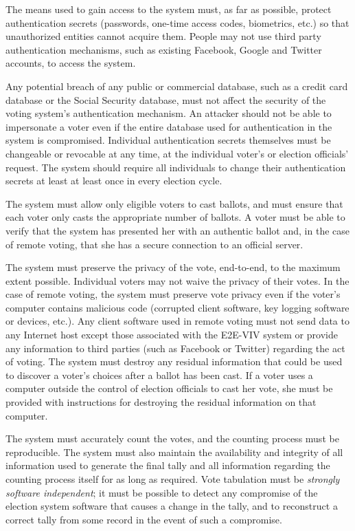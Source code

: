 The means used to gain access to the system must, as far as possible,
protect authentication secrets (passwords, one-time access codes,
biometrics, etc.) so that unauthorized entities cannot acquire
them. People may not use third party authentication mechanisms, such
as existing Facebook, Google and Twitter accounts, to access the
system. 

Any potential breach of any public or commercial database, such as a
credit card database or the Social Security database, must not affect
the security of the voting system's authentication mechanism. An
attacker should not be able to impersonate a voter even if the entire
database used for authentication in the system is
compromised. Individual authentication secrets themselves must be
changeable or revocable at any time, at the individual voter's or
election officials' request. The system should require all individuals
to change their authentication secrets at least at least once in every
election cycle.

The system must allow only eligible voters to cast ballots, and must
ensure that each voter only casts the appropriate number of ballots. A
voter must be able to verify that the system has presented her with an
authentic ballot and, in the case of remote voting, that she has a
secure connection to an official server.

The system must preserve the privacy of the vote, end-to-end, to the
maximum extent possible. Individual voters may not waive the privacy
of their votes. In the case of remote voting, the system must preserve
vote privacy even if the voter's computer contains malicious code
(corrupted client software, key logging software or devices,
etc.). Any client software used in remote voting must not send data to
any Internet host except those associated with the E2E-VIV system or
provide any information to third parties (such as Facebook or Twitter)
regarding the act of voting. The system must destroy any residual
information that could be used to discover a voter's choices after a
ballot has been cast. If a voter uses a computer outside the control
of election officials to cast her vote, she must be provided with
instructions for destroying the residual information on that computer.

The system must accurately count the votes, and the counting process
must be reproducible. The system must also maintain the availability
and integrity of all information used to generate the final tally and
all information regarding the counting process itself for as long as
required. Vote tabulation must be \emph{strongly software
  independent}; it must be possible to detect any compromise of the
election system software that causes a change in the tally, and to
reconstruct a correct tally from some record in the event of such a
compromise.


